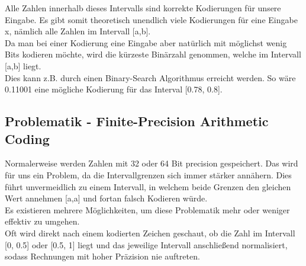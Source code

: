 \documentclass[a4paper]{article}
\theoremstyle{definition}
\theoremstyle{remark}
\begin{document}
Alle Zahlen innerhalb dieses Intervalls sind korrekte Kodierungen für unsere Eingabe. Es gibt somit theoretisch unendlich viele Kodierungen für eine Eingabe x, nämlich alle Zahlen im Intervall [a,b].\\
Da man bei einer Kodierung eine Eingabe aber natürlich mit möglichst wenig Bits kodieren möchte, wird die kürzeste Binärzahl genommen, welche im Intervall [a,b] liegt.\\
Dies kann z.B. durch einen Binary-Search Algorithmus erreicht werden. So wäre 0.11001 eine mögliche Kodierung für das Interval [0.78, 0.8].

\subsection{Problematik - Finite-Precision Arithmetic Coding}
\label{sec:Problematik}
Normalerweise werden Zahlen mit 32 oder 64 Bit precision gespeichert. Das wird für uns ein Problem, da die Intervallgrenzen sich immer stärker annähern. Dies führt unvermeidlich zu einem Intervall, in welchem beide Grenzen den gleichen Wert annehmen [a,a] und  fortan falsch Kodieren würde.\\
Es existieren mehrere Möglichkeiten, um diese Problematik mehr oder weniger effektiv zu umgehen.\\
Oft wird direkt nach einem kodierten Zeichen geschaut, ob die Zahl im Intervall [0, 0.5] oder [0.5, 1] liegt und das jeweilige Intervall anschließend normalisiert, sodass Rechnungen mit hoher Präzision nie auftreten.

\newpage
\end{document}
